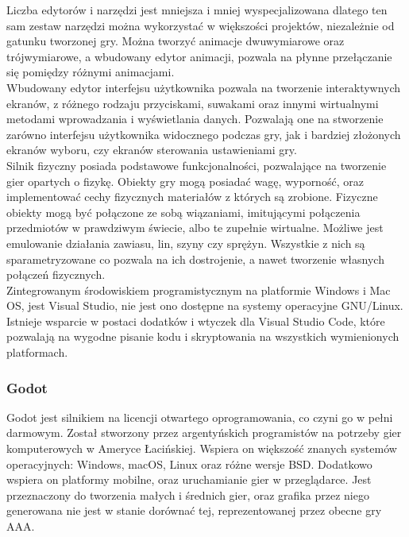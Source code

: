 \documentclass{article} %
\begin{document}
        Liczba edytorów i narzędzi jest mniejsza i mniej wyspecjalizowana dlatego ten sam zestaw narzędzi można wykorzystać w większości projektów, niezależnie od gatunku tworzonej gry. Można tworzyć animacje dwuwymiarowe oraz trójwymiarowe, a wbudowany edytor animacji, pozwala na płynne przełączanie się pomiędzy różnymi animacjami.
        \\
        
        Wbudowany edytor interfejsu użytkownika pozwala na tworzenie interaktywnych ekranów, z różnego rodzaju przyciskami, suwakami oraz innymi wirtualnymi metodami wprowadzania i wyświetlania danych. Pozwalają one na stworzenie zarówno interfejsu użytkownika widocznego podczas gry, jak i bardziej złożonych ekranów wyboru, czy ekranów sterowania ustawieniami gry.
        \\
        
        Silnik fizyczny posiada podstawowe funkcjonalności, pozwalające na tworzenie gier opartych o fizykę. Obiekty gry mogą posiadać wagę, wyporność, oraz implementować cechy fizycznych materiałów z których są zrobione. Fizyczne obiekty mogą być połączone ze sobą wiązaniami, imitującymi połączenia przedmiotów w prawdziwym świecie, albo te zupełnie wirtualne. Możliwe jest emulowanie działania zawiasu, lin, szyny czy sprężyn. Wszystkie z nich są sparametryzowane co pozwala na ich dostrojenie, a nawet tworzenie własnych połączeń fizycznych.
        \\
        
        Zintegrowanym środowiskiem programistycznym na platformie Windows i Mac OS, jest Visual Studio, nie jest ono dostępne na systemy operacyjne GNU/Linux. Istnieje wsparcie w postaci dodatków i wtyczek dla Visual Studio Code, które pozwalają na wygodne pisanie kodu i skryptowania na wszystkich wymienionych platformach.
        \\
         
        
        \subsubsection*{Godot}
        Godot jest silnikiem na licencji otwartego oprogramowania, co czyni go w pełni darmowym. Został stworzony przez argentyńskich programistów na potrzeby gier komputerowych w Ameryce Łacińskiej. Wspiera on większość znanych systemów operacyjnych: Windows, macOS, Linux oraz różne wersje BSD. Dodatkowo wspiera on platformy mobilne, oraz uruchamianie gier w przeglądarce. Jest przeznaczony do tworzenia małych i średnich gier, oraz grafika przez niego generowana nie jest w stanie dorównać tej, reprezentowanej przez obecne gry AAA.
        \\
        
\end{document}

